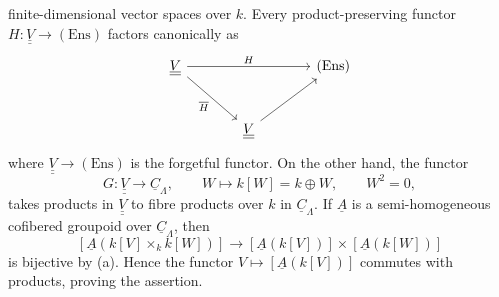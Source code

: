 finite-dimensional vector spaces over $k$. Every product-preserving
functor $H:\underline{\underline V}\longrightarrow(\mathrm{Ens})$
factors canonically as
\[
\begin{tikzcd}[row sep=large,column sep=large]
\underline{\underline V} \arrow[rr,"H"]
 \arrow[dr,"\overline H"'] & & (\mathrm{Ens}) \\
& \underline{\underline V} \arrow[ur] &
\end{tikzcd}
\]
where $\underline{\underline V}\longrightarrow(\mathrm{Ens})$ is the
forgetful functor. On the other hand, the functor
\[
 G:\underline{\underline V}\longrightarrow\underline C_\Lambda,
 \qquad W\longmapsto k[W]=k\oplus W,\qquad W^2=0,
\]
takes products in $\underline{\underline V}$ to fibre products over $k$
in $\underline C_\Lambda$. If $\underline A$ is a semi-homogeneous
cofibered groupoid over $\underline C_\Lambda$, then
\[
 [\underline A(k[V]\times_k k[W])]
 \longrightarrow
 [\underline A(k[V])]\times[\underline A(k[W])]
\]
is bijective by (a). Hence the functor
$V\longmapsto[\underline A(k[V])]$ commutes with products, proving the
assertion.
